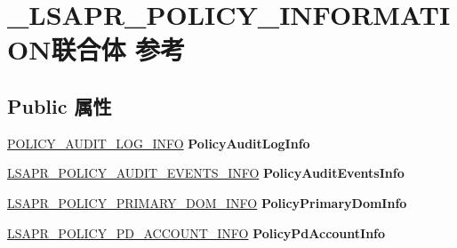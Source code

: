 \hypertarget{union___l_s_a_p_r___p_o_l_i_c_y___i_n_f_o_r_m_a_t_i_o_n}{}\section{\+\_\+\+L\+S\+A\+P\+R\+\_\+\+P\+O\+L\+I\+C\+Y\+\_\+\+I\+N\+F\+O\+R\+M\+A\+T\+I\+O\+N联合体 参考}
\label{union___l_s_a_p_r___p_o_l_i_c_y___i_n_f_o_r_m_a_t_i_o_n}
\subsection*{Public 属性}
\begin{DoxyCompactItemize}
\item 
\mbox{\label{union___l_s_a_p_r___p_o_l_i_c_y___i_n_f_o_r_m_a_t_i_o_n_a0832b0546ea3c29cc4d386141d70b3f1}} 
\hyperlink{struct___p_o_l_i_c_y___a_u_d_i_t___l_o_g___i_n_f_o}{P\+O\+L\+I\+C\+Y\+\_\+\+A\+U\+D\+I\+T\+\_\+\+L\+O\+G\+\_\+\+I\+N\+FO} {\bfseries Policy\+Audit\+Log\+Info}
\item 
\mbox{\label{union___l_s_a_p_r___p_o_l_i_c_y___i_n_f_o_r_m_a_t_i_o_n_a8a09a05b4f7bd47a8cb01b696ac08247}} 
\hyperlink{struct___l_s_a_p_r___p_o_l_i_c_y___a_u_d_i_t___e_v_e_n_t_s___i_n_f_o}{L\+S\+A\+P\+R\+\_\+\+P\+O\+L\+I\+C\+Y\+\_\+\+A\+U\+D\+I\+T\+\_\+\+E\+V\+E\+N\+T\+S\+\_\+\+I\+N\+FO} {\bfseries Policy\+Audit\+Events\+Info}
\item 
\mbox{\label{union___l_s_a_p_r___p_o_l_i_c_y___i_n_f_o_r_m_a_t_i_o_n_a1236bad6e06caa862ffce7ef26e4bbb0}} 
\hyperlink{struct___l_s_a_p_r___p_o_l_i_c_y___p_r_i_m_a_r_y___d_o_m___i_n_f_o}{L\+S\+A\+P\+R\+\_\+\+P\+O\+L\+I\+C\+Y\+\_\+\+P\+R\+I\+M\+A\+R\+Y\+\_\+\+D\+O\+M\+\_\+\+I\+N\+FO} {\bfseries Policy\+Primary\+Dom\+Info}
\item 
\mbox{\label{union___l_s_a_p_r___p_o_l_i_c_y___i_n_f_o_r_m_a_t_i_o_n_ad512834abf813b973b7a62f1d8c9bd13}} 
\hyperlink{struct___l_s_a_p_r___p_o_l_i_c_y___p_d___a_c_c_o_u_n_t___i_n_f_o}{L\+S\+A\+P\+R\+\_\+\+P\+O\+L\+I\+C\+Y\+\_\+\+P\+D\+\_\+\+A\+C\+C\+O\+U\+N\+T\+\_\+\+I\+N\+FO} {\bfseries Policy\+Pd\+Account\+Info}

\end{DoxyCompactItemize}

